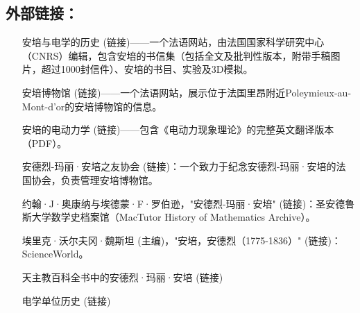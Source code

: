 \subsection{外部链接：}
\begin{itemize}
\item [安培与电学的历史](链接)——一个法语网站，由法国国家科学研究中心（CNRS）编辑，包含安培的书信集（包括全文及批判性版本，附带手稿图片，超过1000封信件）、安培的书目、实验及3D模拟。
\item [安培博物馆](链接)——一个法语网站，展示位于法国里昂附近Poleymieux-au-Mont-d'or的安培博物馆的信息。
\item [安培的电动力学](链接)——包含《电动力现象理论》的完整英文翻译版本（PDF）。
\item [安德烈-玛丽·安培之友协会](链接)：一个致力于纪念安德烈-玛丽·安培的法国协会，负责管理安培博物馆。  
\item [约翰·J·奥康纳与埃德蒙·F·罗伯逊，"安德烈-玛丽·安培"](链接)：圣安德鲁斯大学数学史档案馆（MacTutor History of Mathematics Archive）。  
\item [埃里克·沃尔夫冈·魏斯坦 (主编)，"安培，安德烈（1775-1836）"](链接)：ScienceWorld。  
\item [天主教百科全书中的安德烈·玛丽·安培](链接) 
\item [电学单位历史](链接)
\end{itemize}